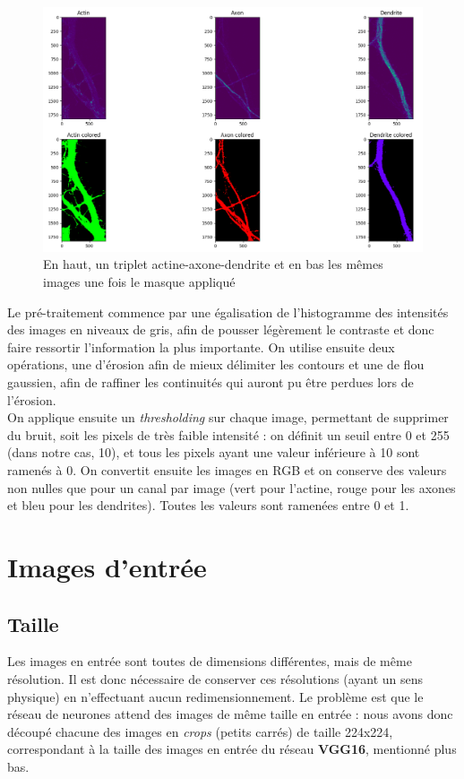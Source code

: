 \documentclass{report}
\begin{document}
\begin{figure}[H]
\centering
\includegraphics[scale=0.35]{"ex_mask"}
\caption{En haut, un triplet actine-axone-dendrite et en bas les mêmes images une fois le masque appliqué}
\end{figure}

Le pré-traitement commence par une égalisation de l'histogramme des intensités
des images en niveaux de gris, afin de pousser légèrement le contraste et donc faire
ressortir l'information la plus importante. On utilise ensuite deux opérations, une d'érosion
afin de mieux délimiter les contours et une de flou gaussien,
afin de raffiner les continuités qui auront pu être perdues lors de l'érosion. \\
On applique ensuite un \textit{thresholding} sur chaque image,
permettant de supprimer du bruit, soit les pixels de très faible intensité :
on définit un seuil entre 0 et 255 (dans notre cas, 10), et tous les pixels ayant
une valeur inférieure à 10 sont ramenés à 0. On convertit ensuite les images en
RGB et on conserve des valeurs non nulles que pour un canal par image (vert pour
l'actine, rouge pour les axones et bleu pour les dendrites). Toutes les valeurs
sont ramenées entre 0 et 1.

\section{Images d'entrée}

\subsection{Taille}

Les images en entrée sont toutes de dimensions différentes, mais de même résolution.
Il est donc nécessaire de conserver ces résolutions (ayant un sens physique) en
n'effectuant aucun redimensionnement. Le problème est que le réseau de neurones
attend des images de même taille en entrée : nous avons donc découpé chacune des
images en \textit{crops} (petits carrés) de taille 224x224, correspondant à la taille
des images en entrée du réseau \textbf{VGG16}, mentionné plus bas.
\end{document}
